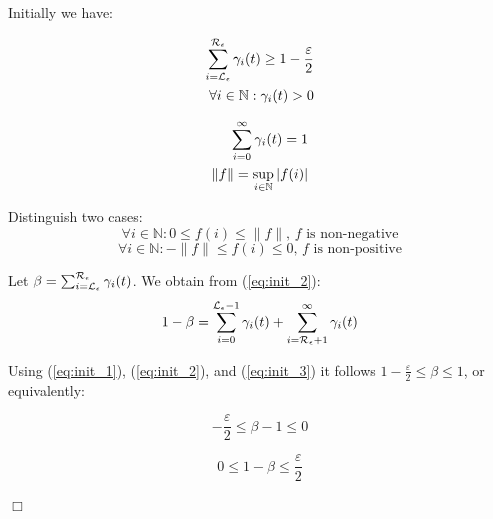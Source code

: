 \documentclass[a4paper,11pt]{article}
\newenvironment{proof}{\trivlist \item[\hskip \labelsep{\bf Proof}]}{\hfill\hbox{$\Box$}\endtrivlist}
\begin{document}
	\begin{proof}
		Initially we have:
		
		\begin{minipage}[t]{0.45\linewidth}
			\begin{eqnarray}
				\sum_{i=\mathcal{L}_{\epsilon}}^{\mathcal{R}_{\epsilon}} \gamma_{i}(t) \geq 1 - \frac{\varepsilon}{2} \label{eq:init_1} \\
				\forall i \in \mathbb{N} : \gamma_{i}(t) > 0 \label{eq:init_3}
			\end{eqnarray}
		\end{minipage} \hfill
		\begin{minipage}[t]{0.45\linewidth}
			\begin{eqnarray}
				\sum_{i=0}^{\infty} \gamma_{i}(t) = 1 \label{eq:init_2} \\
				\|f\| = \sup_{i \in \mathbb{N}}|f(i)| \label{eq:init_4}
			\end{eqnarray}
		\end{minipage}
		
		Distinguish two cases:
		\begin{equation}
			\forall i \in \mathbb{N} : 0 \leq f(i) \leq \|f\| \text{, $f$ is non-negative} \label{eq:funct_pos}
		\end{equation}
		\begin{equation}
			\forall i \in \mathbb{N} : -\|f\| \leq f(i) \leq 0 \text{, $f$ is non-positive} \label{eq:funct_neg}
		\end{equation}
				  
		Let $\beta = \sum_{i=\mathcal{L}_{\epsilon}}^{\mathcal{R}_{\epsilon}} \gamma_{i}(t)$.  We obtain from (\ref{eq:init_2}):
		\begin{equation}
			1 - \beta = \sum_{i = 0}^{\mathcal{L}_{\epsilon}-1} \gamma_{i}(t) + \sum_{i = \mathcal{R}_{\epsilon}+1}^{\infty} \gamma_{i}(t) \label{eq:beta_3}
		\end{equation}
		
		Using (\ref{eq:init_1}), (\ref{eq:init_2}), and (\ref{eq:init_3}) it follows $1- \frac{\varepsilon}{2} \leq \beta \leq 1$, or equivalently:

		\begin{minipage}[t]{0.45\linewidth}
			\begin{equation}
				- \frac{\varepsilon}{2} \leq \beta -1 \leq 0  \label{eq:beta_1}
			\end{equation}
		\end{minipage} \hfill
		\begin{minipage}[t]{0.45\linewidth}
			\begin{equation}
				0 \leq 1- \beta \leq \frac{\varepsilon}{2} \label{eq:beta_2}
			\end{equation}
		\end{minipage}


\end{proof}
\end{document}
